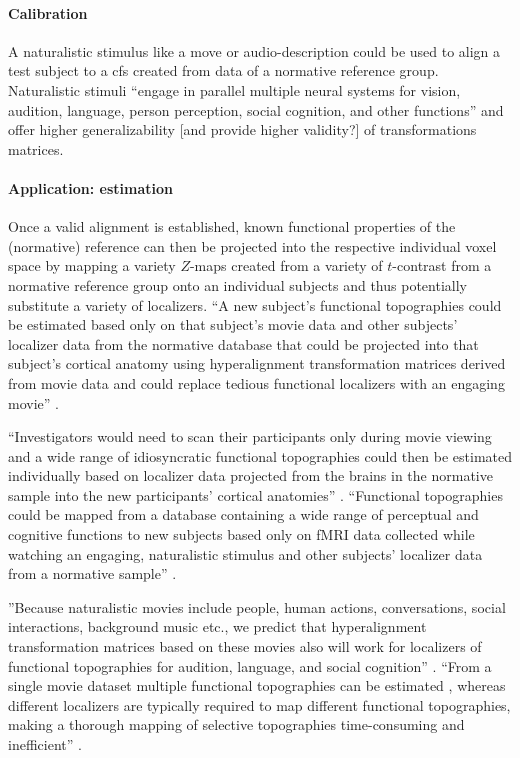 \paragraph{Calibration}
%
A naturalistic stimulus like a move or audio-description could be used to align
a test subject to a \ac{cfs} created from data of a normative reference group.
%
Naturalistic stimuli ``engage in parallel multiple neural systems for vision,
audition, language, person perception, social cognition, and other functions''
\citep{jiahui2020predicting} and offer higher generalizability [and provide
higher validity?] of transformations matrices.



\paragraph{Application: estimation}

%
Once a valid alignment is established, known functional properties of the
(normative) reference can then be projected into the respective individual voxel
space by mapping a variety $Z$-maps created from a variety of $t$-contrast from
a normative reference group onto an individual subjects and thus potentially
substitute a variety of localizers.
%
``A new subject's functional topographies could be estimated based only on that
subject's movie data and other subjects' localizer data from the normative
database that could be projected into that subject's cortical anatomy using
hyperalignment transformation matrices derived from movie data and could replace
tedious functional localizers with an engaging movie''
\citep{jiahui2020predicting}.

%
``Investigators would need to scan their participants only during movie viewing
and a wide range of idiosyncratic functional topographies could then be
estimated individually based on localizer data projected from the brains in the
normative sample into the new participants' cortical anatomies''
\citep{jiahui2020predicting}.
%
``Functional topographies could be mapped from a database containing a wide
range of perceptual and cognitive functions to new subjects based only on fMRI
data collected while watching an engaging, naturalistic stimulus and other
subjects' localizer data from a normative sample'' \citep{jiahui2020predicting}.

%
''Because naturalistic movies include people, human actions, conversations,
social interactions, background music etc., we predict that hyperalignment
transformation matrices based on these movies also will work for localizers of
functional topographies for audition, language, and social cognition''
\citep{jiahui2020predicting}.
%
``From a single movie dataset multiple functional topographies can be estimated
\citep{guntupalli2016model}, whereas different localizers are typically required
to map different functional topographies, making a thorough mapping of selective
topographies time-consuming and inefficient'' \citep{jiahui2020predicting}.


